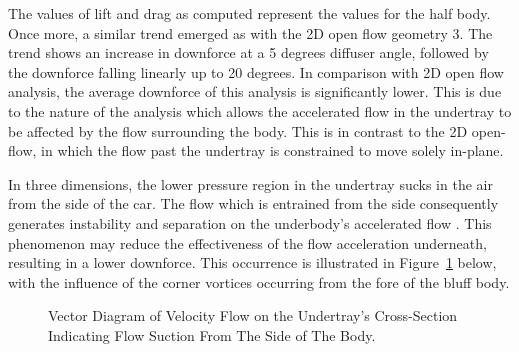 \noindent The values of lift and drag as computed represent the values for the half body. Once more, a similar trend emerged as with the 2D open flow geometry 3. The trend shows an increase in downforce at a 5 degrees diffuser angle, followed by the downforce falling linearly up to 20 degrees. In comparison with 2D open flow analysis, the average downforce of this analysis is significantly lower. This is due to the nature of the analysis which allows the accelerated flow in the undertray to be affected by the flow surrounding the body. This is in contrast to the 2D open-flow, in which the flow past the undertray is constrained to move solely in-plane. 

\noindent In three dimensions, the lower pressure region in the undertray sucks in the air from the side of the car. The flow which is entrained from the side consequently generates instability and separation on the underbody's accelerated flow \cite{Bouferrouk2014OnVehicles}. This phenomenon may reduce the effectiveness of the flow acceleration underneath, resulting in a lower downforce. This occurrence is illustrated in Figure~\ref{fig:Vector_suction_diagram} below, with the influence of the corner vortices occurring from the fore of the bluff body. 

\begin{figure}[!h]
    \centering
    \noindent{}
    \caption{Vector Diagram of Velocity Flow on the Undertray's Cross-Section Indicating Flow Suction From The Side of The Body.}
    \label{fig:Vector_suction_diagram}
\end{figure}

